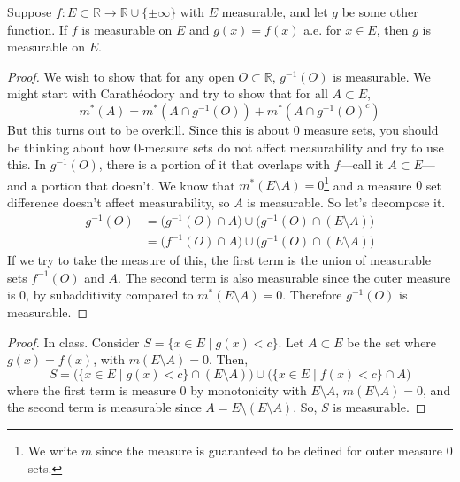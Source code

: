   \begin{theorem}
    Suppose $f: E \subset \mathbb{R} \to \mathbb{R} \cup \{\pm \infty\}$ with $E$ measurable, and let $g$ be some other function. If $f$ is measurable on $E$ and $g(x) = f(x)$ a.e. for $x \in E$, then $g$ is measurable on $E$. 
  \end{theorem}
  \begin{proof}
    We wish to show that for any open $O \subset \mathbb{R}$, $g^{-1} (O)$ is measurable. We might start with Carathéodory and try to show that for all $A \subset E$, 
    \begin{equation}
      m^\ast(A) = m^\ast (A \cap g^{-1}(O)) + m^\ast (A \cap g^{-1}(O)^c)
    \end{equation}
    But this turns out to be overkill. Since this is about $0$ measure sets, you should be thinking about how $0$-measure sets do not affect measurability and try to use this. In $g^{-1}(O)$, there is a portion of it that overlaps with $f$---call it $A \subset E$---and a portion that doesn't. We know that $m^\ast (E \setminus A) = 0$\footnote{We write $m$ since the measure is guaranteed to be defined for outer measure $0$ sets. } and a measure $0$ set difference doesn't affect measurability, so $A$ is measurable. So let's decompose it. 
    \begin{align}
      g^{-1} (O) & = \big( g^{-1} (O) \cap A \big) \cup \big( g^{-1} (O) \cap (E \setminus A) \big) \\ 
                 & = \big( f^{-1} (O) \cap A \big) \cup \big( g^{-1} (O) \cap (E \setminus A) \big)
    \end{align}
    If we try to take the measure of this, the first term is the union of measurable sets $f^{-1} (O)$ and $A$. The second term is also measurable since the outer measure is $0$, by subadditivity compared to $m^\ast(E \setminus A) = 0$. Therefore $g^{-1} (O)$ is measurable. 
  \end{proof}
  \begin{proof}
    In class. Consider $S = \{x \in E \mid g(x) < c \}$. Let $A \subset E$ be the set where $g(x) = f(x)$, with $m (E \setminus A) = 0$. Then, 
    \begin{equation}
      S = \big( \{x \in E \mid g(x) < c\} \cap (E \setminus A) \big) \cup \big( \{x \in E \mid f(x) < c\} \cap A \big) 
    \end{equation}
    where the first term is measure $0$ by monotonicity with $E \setminus A$, $m(E \setminus A) = 0$, and the second term is measurable since $A = E \setminus (E \setminus A)$. So, $S$ is measurable. 
  \end{proof}

